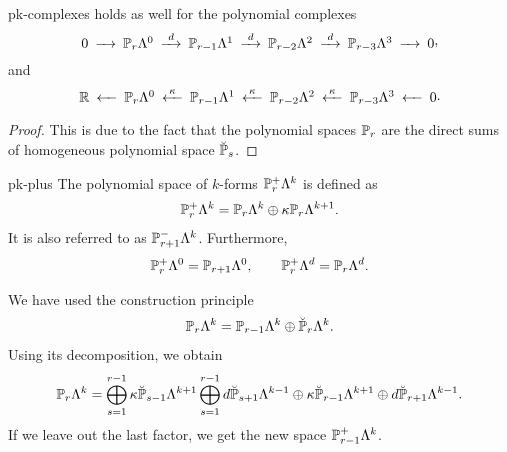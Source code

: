 \begin{Corollary}{pk-complexes}
   holds as well for the
  polynomial complexes
  \begin{gather}\minCDarrowwidth15pt
    \begin{CD}
      0
      @>>> \P_r\Lambda^0
      @>{d}>> \P_{r-1}\Lambda^1
      @>{d}>> \P_{r-2}\Lambda^2
      @>{d}>> \P_{r-3}\Lambda^3
      @>>> 0
    \end{CD},
  \end{gather}
  and
  \begin{gather}\minCDarrowwidth15pt
    \begin{CD}
      \R
      @<<< \P_r\Lambda^0
      @<{\kappa}<< \P_{r-1}\Lambda^1
      @<{\kappa}<< \P_{r-2}\Lambda^2
      @<{\kappa}<< \P_{r-3}\Lambda^3
      @<<< 0
    \end{CD}.
  \end{gather}
\end{Corollary}

\begin{proof}
  This is due to the fact that the polynomial spaces $\P_r$ are the
  direct sums of homogeneous polynomial space $\breve\P_s$.
\end{proof}

\begin{Definition}{pk-plus}
  The polynomial space of $k$-forms $\P_r^+\Lambda^k$ is defined as
  \begin{gather}
    \P_r^+\Lambda^k = \P_r\Lambda^k \oplus \kappa \P_r\Lambda^{k+1}.
  \end{gather}
  It is also referred to as $\P_{r+1}^-\Lambda^k$. Furthermore,
  \begin{gather*}
    \P_r^+\Lambda^0 = \P_{r+1}\Lambda^0,
    \qquad
    \P_r^+\Lambda^d = \P_r\Lambda^d.
  \end{gather*}
\end{Definition}

\begin{remark}
  We have used the construction principle
  \begin{gather*}
    \P_r\Lambda^k = \P_{r-1}\Lambda^k \oplus \breve \P_r\Lambda^k.
  \end{gather*}
  Using its decomposition, we obtain
  \begin{gather*}
    \P_r\Lambda^k =
    \bigoplus_{s=1}^{r-1}\kappa \breve\P_{s-1}\Lambda^{k+1}
    \bigoplus_{s=1}^{r-1} d\breve\P_{s+1}\Lambda^{k-1}
    \oplus \kappa \breve\P_{r-1}\Lambda^{k+1}
    \oplus d\breve\P_{r+1}\Lambda^{k-1}.
  \end{gather*}
  If we leave out the last factor, we get the new space
  $\P_{r-1}^+\Lambda^k$.
\end{remark}

